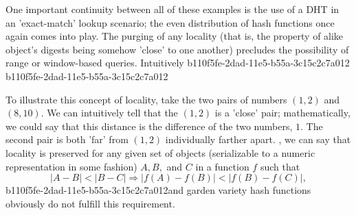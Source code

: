 \documentclass[12pt]{article}
\begin{document}
\par One important continuity between all of these examples is the use of a DHT in an 'exact-match' lookup scenario; the even distribution of hash functions once again comes into play. The purging of any locality (that is, the property of alike object's digests being somehow 'close' to one another) precludes the possibility of range or window-based queries. Intuitively
b110f5fe-2dad-11e5-b55a-3c15c2c7a012
b110f5fe-2dad-11e5-b55a-3c15c2c7a012\par To illustrate this concept of locality, take the two pairs of numbers $(1,2)$ and $(8,10)$. We can intuitively tell that the $(1,2)$ is a 'close' pair; mathematically, we could say that this distance is the difference of the two numbers, $1$. The second pair is both 'far' from $(1,2)$ individually farther apart. , we can say that locality is preserved for any given set of objects (serializable to a numeric representation in some fashion) $A,B,$ and $C$ in a function $f$ such that
\begin{equation}
|A-B| < |B-C| \Rightarrow |f(A)-f(B)| < |f(B) - f(C)|,
\end{equation}
b110f5fe-2dad-11e5-b55a-3c15c2c7a012and garden variety hash functions obviously do not fulfill this requirement.

\printbibliography
\end{document}
